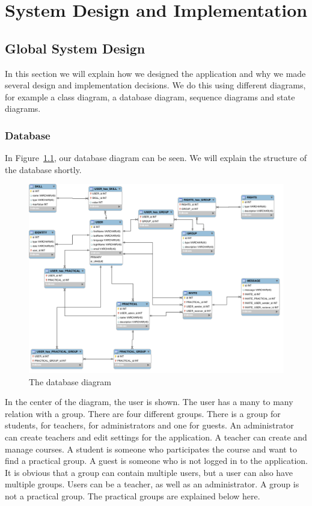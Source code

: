 \chapter{System Design and Implementation}
\label{sec:design_implementation}

\section{Global System Design}
In this section we will explain how we designed the application and why we made several design and implementation decisions.
We do this using different diagrams, for example a class diagram, a database diagram, sequence diagrams and state diagrams.

\subsection{Database}
In Figure~\ref{database_diagram}, our database diagram can be seen.
We will explain the structure of the database shortly.

\begin{figure}[h]
    \centering
    \captionsetup{justification=centering}
    \includegraphics[width=\textwidth, frame]{images/database_diagram}
    \caption{The database diagram}
    \label{database_diagram}
\end{figure}

In the center of the diagram, the user is shown.
The user has a many to many relation with a group.
There are four different groups.
There is a group for students, for teachers, for administrators and one for guests.
An administrator can create teachers and edit settings for the application.
A teacher can create and manage courses.
A student is someone who participates the course and want to find a practical group.
A guest is someone who is not logged in to the application.
It is obvious that a group can contain multiple users, but a user can also have multiple groups.
Users can be a teacher, as well as an administrator.
A group is not a practical group.
The practical groups are explained below here.

